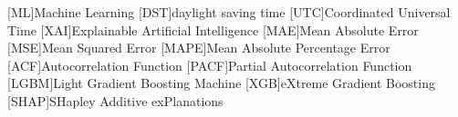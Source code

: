 [ML]{Machine Learning}
[DST]{daylight saving time}
[UTC]{Coordinated Universal Time}
[XAI]{Explainable Artificial Intelligence}
[MAE]{Mean Absolute Error}
[MSE]{Mean Squared Error}
[MAPE]{Mean Absolute Percentage Error}
[ACF]{Autocorrelation Function}
[PACF]{Partial Autocorrelation Function}
[LGBM]{Light Gradient Boosting Machine}
[XGB]{eXtreme Gradient Boosting}
[SHAP]{SHapley Additive exPlanations}
